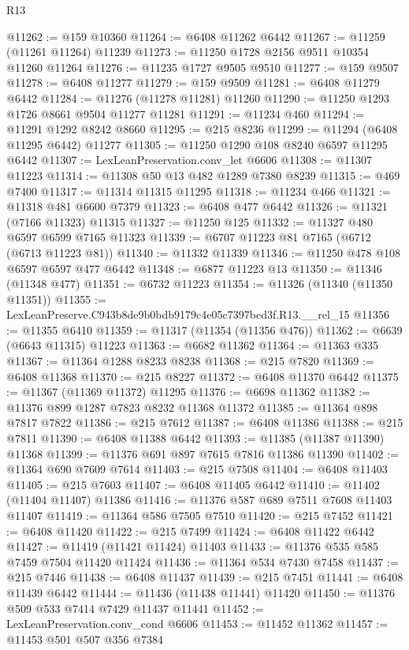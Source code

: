 \begin{lexlean}{R13}
\begin{coremodule}
@11262 := @159 @10360
@11264 := @6408 @11262 @6442
@11267 := @11259 (@11261 @11264) @11239
@11273 := @11250 @1728 @2156 @9511 @10354 @11260 @11264
@11276 := @11235 @1727 @9505 @9510
@11277 := @159 @9507
@11278 := @6408 @11277
@11279 := @159 @9509
@11281 := @6408 @11279 @6442
@11284 := @11276 (@11278 @11281) @11260
@11290 := @11250 @1293 @1726 @8661 @9504 @11277 @11281
@11291 := @11234 @460
@11294 := @11291 @1292 @8242 @8660
@11295 := @215 @8236
@11299 := @11294 (@6408 @11295 @6442) @11277
@11305 := @11250 @1290 @108 @8240 @6597 @11295 @6442
@11307 := LexLeanPreservation.conv_let @6606
@11308 := @11307 @11223
@11314 := @11308 @50 @13 @482 @1289 @7380 @8239
@11315 := @469 @7400
@11317 := @11314 @11315 @11295
@11318 := @11234 @466
@11321 := @11318 @481 @6600 @7379
@11323 := @6408 @477 @6442
@11326 := @11321 (@7166 @11323) @11315
@11327 := @11250 @125
@11332 := @11327 @480 @6597 @6599 @7165 @11323
@11339 := @6707 @11223 @81 @7165 (@6712 (@6713 @11223 @81))
@11340 := @11332 @11339
@11346 := @11250 @478 @108 @6597 @6597 @477 @6442
@11348 := @6877 @11223 @13
@11350 := @11346 (@11348 @477)
@11351 := @6732 @11223
@11354 := @11326 (@11340 (@11350 @11351))
@11355 := LexLeanPreserve.C943b8de9b0bdb9179c4e05c7397bed3f.R13.__rel_15
@11356 := @11355 @6410
@11359 := @11317 (@11354 (@11356 @476))
@11362 := @6639 (@6643 @11315) @11223
@11363 := @6682 @11362
@11364 := @11363 @335
@11367 := @11364 @1288 @8233 @8238
@11368 := @215 @7820
@11369 := @6408 @11368
@11370 := @215 @8227
@11372 := @6408 @11370 @6442
@11375 := @11367 (@11369 @11372) @11295
@11376 := @6698 @11362
@11382 := @11376 @899 @1287 @7823 @8232 @11368 @11372
@11385 := @11364 @898 @7817 @7822
@11386 := @215 @7612
@11387 := @6408 @11386
@11388 := @215 @7811
@11390 := @6408 @11388 @6442
@11393 := @11385 (@11387 @11390) @11368
@11399 := @11376 @691 @897 @7615 @7816 @11386 @11390
@11402 := @11364 @690 @7609 @7614
@11403 := @215 @7508
@11404 := @6408 @11403
@11405 := @215 @7603
@11407 := @6408 @11405 @6442
@11410 := @11402 (@11404 @11407) @11386
@11416 := @11376 @587 @689 @7511 @7608 @11403 @11407
@11419 := @11364 @586 @7505 @7510
@11420 := @215 @7452
@11421 := @6408 @11420
@11422 := @215 @7499
@11424 := @6408 @11422 @6442
@11427 := @11419 (@11421 @11424) @11403
@11433 := @11376 @535 @585 @7459 @7504 @11420 @11424
@11436 := @11364 @534 @7430 @7458
@11437 := @215 @7446
@11438 := @6408 @11437
@11439 := @215 @7451
@11441 := @6408 @11439 @6442
@11444 := @11436 (@11438 @11441) @11420
@11450 := @11376 @509 @533 @7414 @7429 @11437 @11441
@11452 := LexLeanPreservation.conv_cond @6606
@11453 := @11452 @11362
@11457 := @11453 @501 @507 @356 @7384

\end{coremodule}
\end{lexlean}
